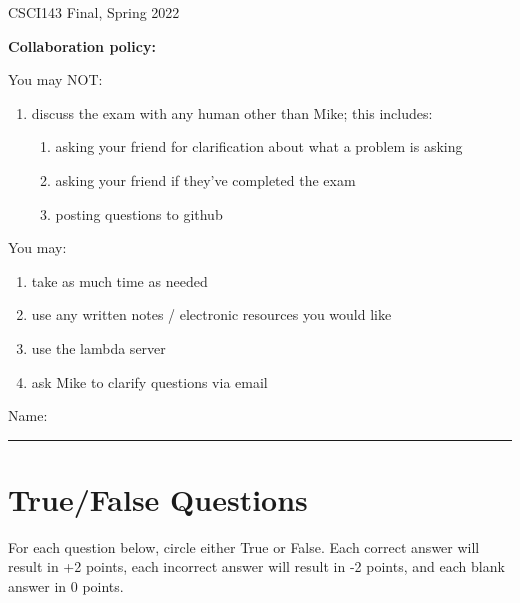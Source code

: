 \documentclass[12pt]{exam}
\theoremstyle{definition}
\begin{document}
\begin{center}
    {
\Large
    CSCI143 Final, Spring 2022
}

    \vspace{0.1in}
\end{center}

\noindent
\textbf{Collaboration policy:} 

\vspace{0.1in}
\noindent
You may NOT:
\begin{enumerate}
    \item discuss the exam with any human other than Mike; this includes:
        \begin{enumerate}
            \item asking your friend for clarification about what a problem is asking
            \item asking your friend if they've completed the exam
            \item posting questions to github
        \end{enumerate}
\end{enumerate}

\noindent
You may:
\begin{enumerate}
    \item take as much time as needed
    \item use any written notes / electronic resources you would like
    \item use the lambda server
    \item ask Mike to clarify questions via email
\end{enumerate}


\vspace{0.15in}

\vspace{0.25in}
\noindent
Name: 

\noindent
\rule{\textwidth}{0.1pt}
\vspace{0.15in}

\newpage
\section{True/False Questions}

For each question below, circle either True or False.
Each correct answer will result in +2 points,
each incorrect answer will result in -2 points,
and each blank answer in 0 points.
\end{document}

